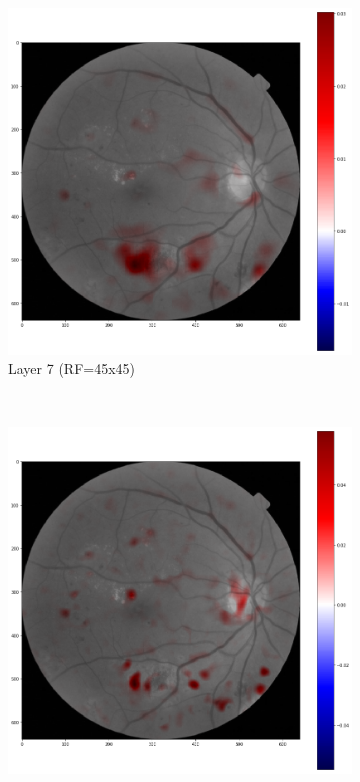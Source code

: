 \documentclass[review]{elsarticle}
\theoremstyle{definition} %
\theoremstyle{remark}
\begin{document}
\begin{figure}[!ht]
\begin{subfigure}{0.45\textwidth}
		\includegraphics[width=\textwidth]{./figures/maps/rf45c.png}
		\caption{Layer 7 (RF=45x45)}
		\label{fig:score_rf45}
	\end{subfigure}\\
	\begin{subfigure}{0.45\textwidth}
		\includegraphics[width=\textwidth]{./figures/maps/rf29c.png}

\end{subfigure}
\end{figure}
\end{document}
